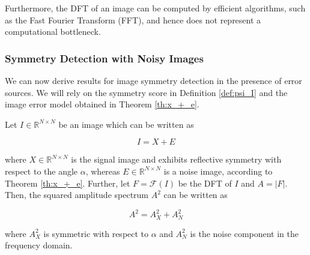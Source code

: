 Furthermore, the DFT of an image can be computed by efficient algorithms, such as the Fast Fourier Transform (FFT)\cite{brigham1988fast}, and hence does not represent a computational bottleneck.

\subsubsection{Symmetry Detection with Noisy Images}

We can now derive results for image symmetry detection in the presence of error sources. We will rely on the symmetry score in Definition \ref{def:psi_I} and the image error model obtained in Theorem \ref{th:x_+_e}.

\begin{lemma}
\label{lemma:A_symm_plus_blob}
    Let $I\in\mathbb{R}^{N\times N}$ be an image which can be written as 

    \begin{equation}
        I = X + E
    \end{equation}
    
    where $X \in \mathbb{R}^{N\times N}$ is the signal image and exhibits reflective symmetry with respect to the angle $\alpha$, whereas $E\in \mathbb{R}^{N\times N}$ is a noise image, according to Theorem \ref{th:x_+_e}. Further, let $F = \mathcal{F}(I)$ be the DFT of $I$ and $A=|F|$. Then, the squared amplitude spectrum $A^2$ can be written as

    \begin{equation}
        A^2 = A^2_{X} + A^2_N
    \end{equation}

    where $A^2_{X}$ is symmetric with respect to $\alpha$ and $A^2_N$ is the noise component in the frequency domain.
    
\end{lemma}

